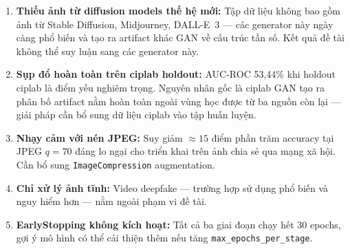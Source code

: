 \begin{enumerate}
  \item \textbf{Thiếu ảnh từ diffusion models thế hệ mới:} Tập dữ liệu không bao gồm ảnh từ Stable Diffusion, Midjourney, DALL-E~3 --- các generator này ngày càng phổ biến và tạo ra artifact khác GAN về cấu trúc tần số. Kết quả đề tài không thể suy luận sang các generator này.

  \item \textbf{Sụp đổ hoàn toàn trên ciplab holdout:} AUC-ROC 53,44\% khi holdout ciplab là điểm yếu nghiêm trọng. Nguyên nhân gốc là ciplab GAN tạo ra phân bố artifact nằm hoàn toàn ngoài vùng học được từ ba nguồn còn lại --- giải pháp cần bổ sung dữ liệu ciplab vào tập huấn luyện.

  \item \textbf{Nhạy cảm với nén JPEG:} Suy giảm $\approx 15$ điểm phần trăm accuracy tại JPEG $q=70$ đáng lo ngại cho triển khai trên ảnh chia sẻ qua mạng xã hội. Cần bổ sung \texttt{ImageCompression} augmentation.

  \item \textbf{Chỉ xử lý ảnh tĩnh:} Video deepfake --- trường hợp sử dụng phổ biến và nguy hiểm hơn --- nằm ngoài phạm vi đề tài.

  \item \textbf{EarlyStopping không kích hoạt:} Tất cả ba giai đoạn chạy hết 30 epochs, gợi ý mô hình có thể cải thiện thêm nếu tăng \texttt{max\_epochs\_per\_stage}.
\end{enumerate}
